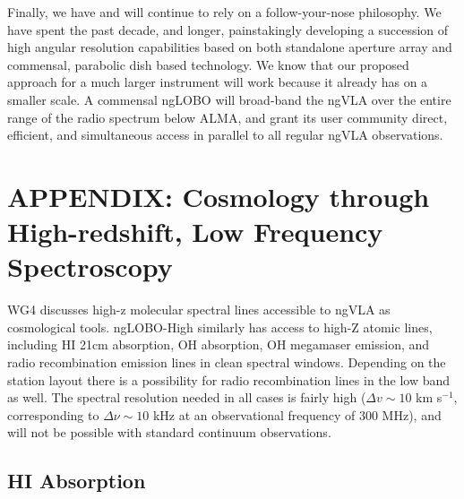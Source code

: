 \documentclass[11pt]{article}
\newcommand{\tododetail}{\todo[inline,color=green!40]}
\begin{document}
Finally, we have and will continue to rely on a follow-your-nose philosophy. We have spent the past decade, and longer, painstakingly developing a succession of high angular resolution capabilities based on both standalone aperture array and commensal, parabolic dish based technology. We know that our proposed approach for a much larger instrument will work because it already has on a smaller scale. A commensal ngLOBO will broad-band the ngVLA over the entire range of the radio spectrum below ALMA, and grant its user community direct, efficient, and simultaneous access in parallel to all regular ngVLA observations. 


\vfill
\eject








\section{APPENDIX: Cosmology through High-redshift, Low Frequency Spectroscopy}





WG4 discusses high-z molecular spectral lines accessible to ngVLA as cosmological tools. ngLOBO-High similarly has access to high-Z atomic lines, including HI 21cm absorption, OH absorption, OH megamaser emission,  and radio recombination emission lines in clean spectral windows. Depending on the station layout there is a possibility for radio recombination lines in the low band as well. The spectral resolution needed in all cases is fairly high ($\Delta v\sim 10$ km s$^{-1}$, corresponding to $\Delta \nu\sim 10$ kHz at an observational frequency of 300 MHz), and will not be possible with standard continuum observations.

\subsection{HI Absorption}
\end{document}
